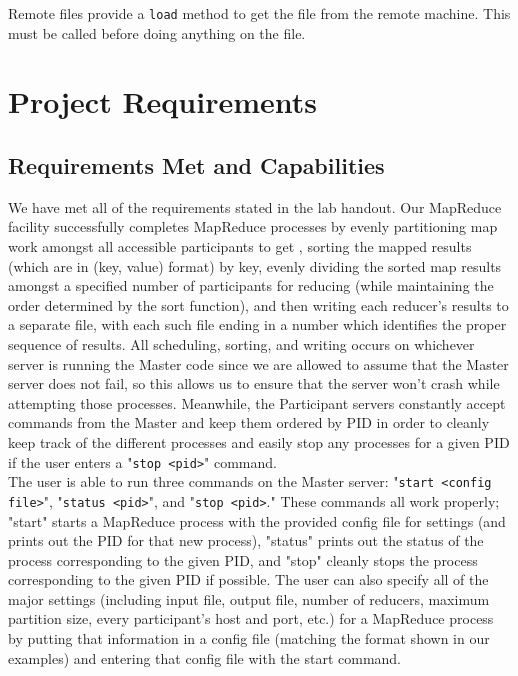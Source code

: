 \documentclass[12pt]{article}
\newcommand{\ttt}{\texttt}
\begin{document}
Remote files provide a \ttt{load} method to get the file from the remote machine. This must be called before doing anything on the file.

\section{Project Requirements}

\subsection{Requirements Met and Capabilities}

We have met all of the requirements stated in the lab handout. Our MapReduce facility successfully completes MapReduce processes by evenly partitioning map work amongst all accessible participants to get , sorting the mapped results (which are in (key, value) format) by key, evenly dividing the sorted map results amongst a specified number of participants for reducing (while maintaining the order determined by the sort function), and then writing each reducer's results to a separate file, with each such file ending in a number which identifies the proper sequence of results. All scheduling, sorting, and writing occurs on whichever server is running the Master code since we are allowed to assume that the Master server does not fail, so this allows us to ensure that the server won't crash while attempting those processes. Meanwhile, the Participant servers constantly accept commands from the Master and keep them ordered by PID in order to cleanly keep track of the different processes and easily stop any processes for a given PID if the user enters a "\verb|stop <pid>|" command.\\
The user is able to run three commands on the Master server: "\verb|start <config file>|", "\verb|status <pid>|", and "\verb|stop <pid>|." These commands all work properly; "start" starts a MapReduce process with the provided config file for settings (and prints out the PID for that new process), "status" prints out the status of the process corresponding to the given PID, and "stop" cleanly stops the process corresponding to the given PID if possible. The user can also specify all of the major settings (including input file, output file, number of reducers, maximum partition size, every participant's host and port, etc.) for a MapReduce process by putting that information in a config file (matching the format shown in our examples) and entering that config file with the start command. \\
\end{document}
